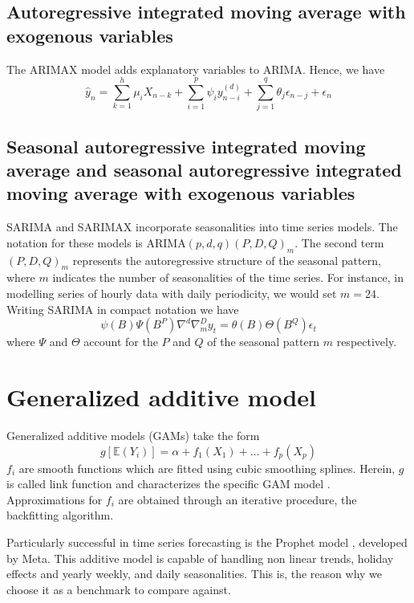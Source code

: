 \subsection{Autoregressive integrated moving average with exogenous variables}
The ARIMAX model adds explanatory variables to ARIMA. Hence, we have
\begin{equation}
    \hat{y}_n=\sum\limits_{k=1}^{h} \mu_i X_{n-k}+\sum\limits_{i=1}^{p}\psi_i y_{n-i}^{(d)}+\sum\limits_{j=1}^{q}\theta_j \epsilon_{n-j}+ \epsilon_{n}
\end{equation}
\subsection{Seasonal autoregressive integrated moving average and seasonal autoregressive integrated moving average with exogenous variables}
SARIMA and SARIMAX incorporate seasonalities into time series models. The notation for these models is ARIMA$(p,d,q)(P,D,Q)_m$. The second term $(P,D,Q)_m$ represents the autoregressive structure of the seasonal pattern, where $m$ indicates the number of seasonalities of the time series.
For instance, in modelling series of hourly data with daily periodicity, we would set $m=24$.
Writing SARIMA in compact notation we have
\\
\begin{equation}
    \psi(B)\Psi(B^P)\nabla^d\nabla_m^Dy_t=\theta(B)\Theta(B^Q)\epsilon_t
\end{equation}
where $\Psi$ and $\Theta$ account for the $P$ and $Q$ of the seasonal pattern $m$ respectively.
\section{Generalized additive model}
Generalized additive models (GAMs) take the form
\begin{equation}
    g[\mathbb{E}(Y_i)]=\alpha+f_1(X_1)+\dots+f_p(X_p)
\end{equation}
$f_i$ are smooth functions which are fitted using cubic smoothing splines.
Herein, $g$ is called link function and characterizes the specific GAM model \cite{hastie2017generalized}. Approximations for $f_i$ are obtained through an iterative procedure, the backfitting algorithm.

Particularly successful in time series forecasting is the Prophet model \cite{taylor2018forecasting}, developed by Meta. This additive model is capable of handling non linear trends, holiday effects and yearly weekly, and daily seasonalities. This is, the reason why we choose it as a benchmark to compare against.
